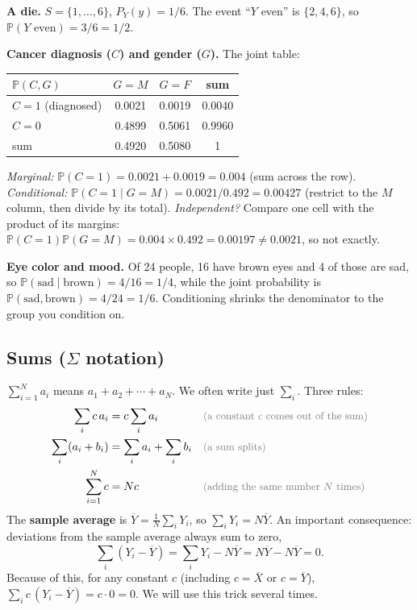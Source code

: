 \documentclass[11pt]{article}
\renewcommand{\P}{\mathbb{P}}
\newcommand{\given}{\mid}
\newcommand{\Ybar}{\overline{Y}}
\newcommand{\Xbar}{\overline{X}}
\newcommand{\why}[1]{&&\text{\small\color{gray}(#1)}}
\begin{document}
\begin{examplebox}[title={Examples (Lectures 1--2)}]
\textbf{A die.} $S=\{1,\dots,6\}$, $P_Y(y)=1/6$. The event ``$Y$ even'' is $\{2,4,6\}$, so $\P(Y\text{ even})=3/6=1/2$.

\textbf{Cancer diagnosis ($C$) and gender ($G$).} The joint table:
\begin{center}
\begin{tabular}{lccc}
\toprule
$\P(C,G)$ & $G=M$ & $G=F$ & sum\\\midrule
$C=1$ (diagnosed) & 0.0021 & 0.0019 & 0.0040\\
$C=0$ & 0.4899 & 0.5061 & 0.9960\\\midrule
sum & 0.4920 & 0.5080 & 1\\
\bottomrule
\end{tabular}
\end{center}
\emph{Marginal:} $\P(C=1)=0.0021+0.0019=0.004$ (sum across the row). \emph{Conditional:}
$\P(C=1\given G=M)=0.0021/0.492=0.00427$ (restrict to the $M$ column, then divide by its total).
\emph{Independent?} Compare one cell with the product of its margins: $\P(C{=}1)\P(G{=}M)=0.004\times0.492=0.00197\ne0.0021$, so not exactly.

\textbf{Eye color and mood.} Of 24 people, 16 have brown eyes and 4 of those are sad, so $\P(\text{sad}\given\text{brown})=4/16=1/4$,
while the joint probability is $\P(\text{sad},\text{brown})=4/24=1/6$. Conditioning shrinks the denominator to the group you condition on.
\end{examplebox}

\subsection{Sums ($\Sigma$ notation)}
$\sum_{i=1}^N a_i$ means $a_1+a_2+\cdots+a_N$. We often write just $\sum_i$. Three rules:
\begin{align*}
\sum_i c\,a_i &= c\sum_i a_i \why{a constant $c$ comes out of the sum}\\
\sum_i (a_i+b_i) &= \sum_i a_i+\sum_i b_i \why{a sum splits}\\
\sum_{i=1}^N c &= Nc \why{adding the same number $N$ times}
\end{align*}
The \textbf{sample average} is $\Ybar=\frac1N\sum_i Y_i$, so $\sum_i Y_i=N\Ybar$. An important consequence: deviations from the
sample average always sum to zero,
\[
\sum_i (Y_i-\Ybar)=\sum_i Y_i-N\Ybar=N\Ybar-N\Ybar=0 .
\]
Because of this, for any constant $c$ (including $c=\Xbar$ or $c=\Ybar$), $\sum_i c\,(Y_i-\Ybar)=c\cdot 0=0$. We will use this trick
several times.
\end{document}
